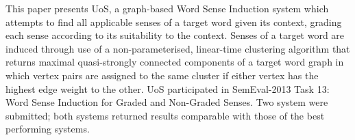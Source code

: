 This paper presents UoS, a graph-based Word Sense Induction system which attempts to find all applicable senses of a target word given its context,
 grading each sense according to its suitability to the context. Senses of a
 target word are induced through use of a non-parameterised, linear-time
 clustering algorithm that returns maximal quasi-strongly connected components
 of a target word graph
 in which vertex pairs are assigned to the same cluster if either vertex has the
 highest edge weight to the other. UoS participated in SemEval-2013 Task 13:
 Word Sense Induction for Graded and Non-Graded Senses. Two system were
 submitted; both systems returned results comparable with those of the best
 performing systems.

